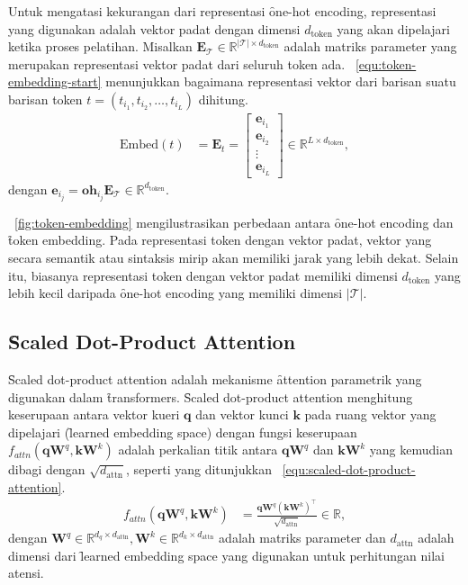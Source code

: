 	Untuk mengatasi kekurangan dari representasi \f{one-hot encoding}, representasi yang digunakan adalah vektor padat dengan dimensi $d_{\text{token}}$ yang akan dipelajari ketika proses pelatihan. Misalkan $\mathbf{E}_{\mathcal{T}} \in \mathbb{R}^{|\mathcal{T}| \times d_{\text{token}}}$ adalah matriks parameter yang merupakan representasi vektor padat dari seluruh token ada. \equ~\ref{equ:token-embedding-start}  menunjukkan bagaimana representasi vektor dari barisan suatu barisan token $t = (t_{i_1}, t_{i_2}, \dots, t_{i_L})$ dihitung.
	\begin{align}
		\label{equ:token-embedding-start}
		\text{Embed}(t) &= \mathbf{E}_{t} = \begin{bmatrix}
			\mathbf{e}_{i_1} \\
			\mathbf{e}_{i_2} \\
			\vdots \\
			\mathbf{e}_{i_L}
		\end{bmatrix} \in \mathbb{R}^{L \times d_{\text{token}}}, 
			\end{align}
dengan $\mathbf{e}_{i_j} = \mathbf{oh}_{i_j} \mathbf{E}_{\mathcal{T}} \in \mathbb{R}^{d_{\text{token}}}.$
	
 \pic~\ref{fig:token-embedding} mengilustrasikan perbedaan antara \f{one-hot encoding} dan \f{token embedding}. Pada representasi token dengan vektor padat, vektor yang secara semantik atau sintaksis mirip akan memiliki jarak yang lebih dekat. Selain itu, biasanya representasi token dengan vektor padat memiliki dimensi $d_{\text{token}}$ yang lebih kecil daripada \f{one-hot encoding} yang memiliki dimensi $|\mathcal{T}|$.

	\subsection{\f{Scaled Dot-Product Attention}}
	\label{sec:scaled-dot-product-attention}

	\f{Scaled dot-product attention} adalah mekanisme \f{attention} parametrik yang digunakan dalam \f{transformers}. \f{Scaled dot-product attention} menghitung keserupaan antara vektor kueri $\mathbf{q}$ dan vektor kunci $\mathbf{k}$ pada ruang vektor yang dipelajari (\f{learned embedding space}) dengan fungsi keserupaan $f_{attn}(\mathbf{q} \mathbf{W}^q, \mathbf{k}\mathbf{W}^k) $ adalah perkalian titik antara $\mathbf{qW}^q$ dan $\mathbf{kW}^k$ yang kemudian dibagi dengan $\sqrt{d_{\text{attn}}}$, seperti yang ditunjukkan \equ~\ref{equ:scaled-dot-product-attention}.
	\begin{align}
		\label{equ:scaled-dot-product-attention}
		f_{attn}(\mathbf{q} \mathbf{W}^q, \mathbf{k} \mathbf{W}^k) &= \frac{\mathbf{q} \mathbf{W}^q (\mathbf{k} \mathbf{W}^k)^{\top}}{\sqrt{d_{\text{attn}}}} \in \mathbb{R},
	\end{align}
	dengan $\mathbf{W}^q \in \mathbb{R}^{d_q \times d_{\text{attn}}}, \mathbf{W}^k \in \mathbb{R}^{d_k \times d_{\text{attn}}}$ adalah matriks parameter dan $d_{\text{attn}}$ adalah dimensi dari \f{learned embedding space} yang digunakan untuk perhitungan nilai atensi. 

